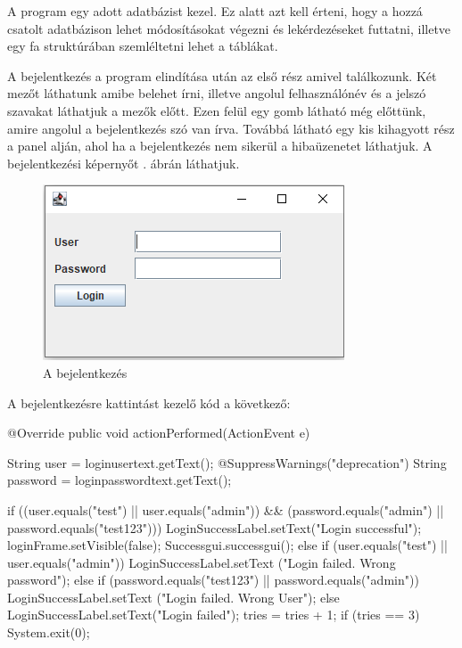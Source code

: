 
A program egy adott adatbázist kezel. Ez alatt azt kell érteni, hogy a hozzá csatolt adatbázison lehet módosításokat végezni és lekérdezéseket futtatni, illetve egy fa struktúrában szemléltetni lehet a táblákat.


A bejelentkezés a program elindítása után az első rész amivel találkozunk. Két mezőt láthatunk amibe belehet írni, illetve angolul felhasználónév és a jelszó szavakat láthatjuk a mezők előtt. Ezen felül egy gomb látható még előttünk, amire angolul a bejelentkezés szó van írva. Továbbá látható egy kis kihagyott rész a panel alján, ahol ha a bejelentkezés nem sikerül a hibaüzenetet láthatjuk.
A bejelentkezési képernyőt . ábrán láthatjuk.
\begin{figure} [h]
	\centering
	\includegraphics[width=.5\linewidth]{images/login.png}
	\caption{A bejelentkezés}
	\label{fig:login}
\end{figure}

\newpage
A bejelentkezésre kattintást kezelő kód a következő:

\begin{java}
@Override
public void actionPerformed(ActionEvent e) {
	
	String user = loginusertext.getText();
	@SuppressWarnings("deprecation")
	String password = loginpasswordtext.getText();
		
	if ((user.equals("test") || user.equals("admin"))
		&& (password.equals("admin") ||
	 	password.equals("test123"))) {
		LoginSuccessLabel.setText("Login successful");
		loginFrame.setVisible(false);
		Successgui.successgui();		
	} else if (user.equals("test") ||
	 	user.equals("admin")) {
		LoginSuccessLabel.setText
		("Login failed. Wrong password");
	} else if (password.equals("test123") ||
		 password.equals("admin")) {
		LoginSuccessLabel.setText
		("Login failed. Wrong User");
	} else
		LoginSuccessLabel.setText("Login failed");
		tries = tries + 1;
	if (tries == 3) {
		System.exit(0);
	}	
}	
\end{java}
\newpage
{}

